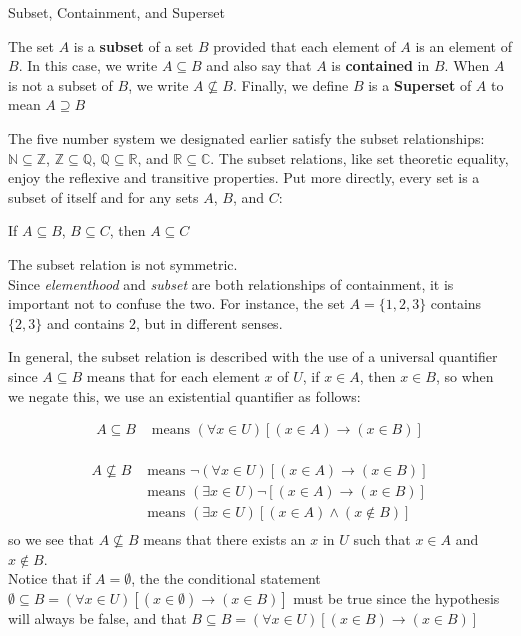 \begin{definition}
Subset, Containment, and Superset \\

\begin{tcolorbox}
    The set $A$ is a {\bf subset} of a set $B$ provided that each element of $A$ is an  element of $B$. In this case, we write $A \subseteq B$ and also say that $A$ is {\bf contained} in $B$. When $A$ is not a subset of $B$, we write $A \nsubseteq B$. Finally, we define $B$ is a \textbf{Superset} of $A$ to mean $A \supseteq B$ 
\end{tcolorbox}

The five number system we designated earlier satisfy the subset relationships: $\mathbb{N} \subseteq \mathbb{Z}$, $\mathbb{Z} \subseteq \mathbb{Q}$, $\mathbb{Q} \subseteq \mathbb{R}$, and $\mathbb{R} \subseteq \mathbb{C}$. The subset relations, like set theoretic equality, enjoy the reflexive and transitive properties. Put more directly, every set is a subset of itself and for any sets $A$, $B$, and $C$:
    \begin{center}
        If $A \subseteq B$, $B \subseteq C$, then $A \subseteq C$
    \end{center}
The subset relation is not symmetric. \\

Since \textit{elementhood} and \textit{subset} are both relationships of containment, it is important not to confuse the two. For instance, the set $A = \{ 1, 2 , 3 \}$ contains $\{ 2, 3 \}$ and contains $2$, but in different senses. 

In general, the subset relation is described with the use of a universal quantifier since $A \subseteq B$ means that for each element $x$ of $U$, if $x \in A$, then $x \in B$, so when we negate this, we use an existential quantifier  as follows: 

\begin{align*}
A \subseteq B & \text{ means } (\forall x \in U) [(x \in A) \to (x \in B)] \nonumber \\
\end{align*}

\begin{align*}
A \nsubseteq B & \text{ means } \neg (\forall x \in U) [(x \in A) \to (x \in B)] \nonumber\\
       & \text{ means } (\exists x \in U) \neg [(x \in A) \to (x \in B)] \nonumber\\
       & \text{ means } (\exists x \in U) [(x \in A) \wedge (x \notin B)] \nonumber\\
\end{align*}
so we see that $A \nsubseteq B$ means  that there exists an $x$ in $U$ such that $x \in A$ and $x \notin B$. \\

Notice that if $A = \emptyset$, the the conditional statement $ \emptyset \subseteq B = (\forall x \in U) [(x \in \emptyset) \to (x \in B)]$ must be true since the hypothesis will always be false, and that  $B \subseteq B = (\forall x \in U) [(x \in B) \to (x \in B)]$

\end{definition}

